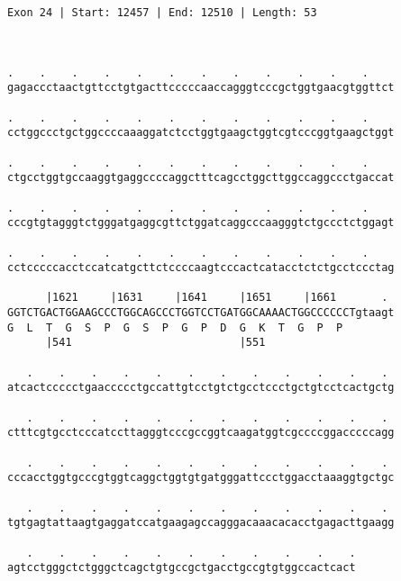 \documentclass{article}
\begin{document}
\begin{Verbatim}
Exon 24 | Start: 12457 | End: 12510 | Length: 53



.    .    .    .    .    .    .    .    .    .    .    .    
gagaccctaactgttcctgtgacttcccccaaccagggtcccgctggtgaacgtggttct
                                                            
.    .    .    .    .    .    .    .    .    .    .    .    
cctggccctgctggccccaaaggatctcctggtgaagctggtcgtcccggtgaagctggt
                                                            
.    .    .    .    .    .    .    .    .    .    .    .    
ctgcctggtgccaaggtgaggccccaggctttcagcctggcttggccaggccctgaccat
                                                            
.    .    .    .    .    .    .    .    .    .    .    .    
cccgtgtagggtctgggatgaggcgttctggatcaggcccaagggtctgccctctggagt
                                                            
.    .    .    .    .    .    .    .    .    .    .    .    
cctcccccacctccatcatgcttctccccaagtcccactcatacctctctgcctccctag
                                                            
      |1621     |1631     |1641     |1651     |1661       . 
GGTCTGACTGGAAGCCCTGGCAGCCCTGGTCCTGATGGCAAAACTGGCCCCCCTgtaagt
G  L  T  G  S  P  G  S  P  G  P  D  G  K  T  G  P  P        
      |541                          |551                    
  
   .    .    .    .    .    .    .    .    .    .    .    . 
atcactccccctgaaccccctgccattgtcctgtctgcctccctgctgtcctcactgctg
                                                            
   .    .    .    .    .    .    .    .    .    .    .    . 
ctttcgtgcctcccatccttagggtcccgccggtcaagatggtcgccccggacccccagg
                                                            
   .    .    .    .    .    .    .    .    .    .    .    . 
cccacctggtgcccgtggtcaggctggtgtgatgggattccctggacctaaaggtgctgc
                                                            
   .    .    .    .    .    .    .    .    .    .    .    . 
tgtgagtattaagtgaggatccatgaagagccagggacaaacacacctgagacttgaagg
                                                            
   .    .    .    .    .    .    .    .    .    .    .
agtcctgggctctgggctcagctgtgccgctgacctgccgtgtggccactcact
                                                      

\end{Verbatim}
\end{document}
